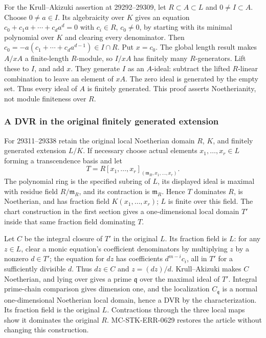 For the Krull--Akizuki assertion at 29292--29309, let \(R\subset A\subset L\) and \(0\ne I\subset A\). Choose \(0\ne a\in I\). Its algebraicity over \(K\) gives an equation \(c_0+c_1a+\cdots+c_da^d=0\) with \(c_i\in R\), \(c_0\ne0\), by starting with its minimal polynomial over \(K\) and clearing every denominator. Then \(c_0=-a(c_1+\cdots+c_da^{d-1})\in I\cap R\). Put \(x=c_0\). The global length result makes \(A/xA\) a finite-length \(R\)-module, so \(I/xA\) has finitely many \(R\)-generators. Lift these to \(I\), and add \(x\). They generate \(I\) as an \(A\)-ideal: subtract the lifted \(R\)-linear combination to leave an element of \(xA\). The zero ideal is generated by the empty set. Thus every ideal of \(A\) is finitely generated. This proof asserts Noetherianity, not module finiteness over \(R\).

\subsubsection{A DVR in the original finitely generated extension}\label{a-dvr-in-the-original-finitely-generated-extension}

For 29311--29338 retain the original local Noetherian domain \(R\), \(K\), and finitely generated extension \(L/K\). If necessary choose actual elements \(x_1,\ldots,x_r\in L\) forming a transcendence basis and let \[
 T=R[x_1,\ldots,x_r]_{(\mathfrak m_R,x_1,\ldots,x_r)}.
\] The polynomial ring is the specified subring of \(L\), its displayed ideal is maximal with residue field \(R/\mathfrak m_R\), and its contraction is \(\mathfrak m_R\). Hence \(T\) dominates \(R\), is Noetherian, and has fraction field \(K(x_1,\ldots,x_r)\); \(L\) is finite over this field. The chart construction in the first section gives a one-dimensional local domain \(T'\) inside that same fraction field dominating \(T\).

Let \(C\) be the integral closure of \(T'\) in the original \(L\). Its fraction field is \(L\): for any \(z\in L\), clear a monic equation's coefficient denominators by multiplying \(z\) by a nonzero \(d\in T'\); the equation for \(dz\) has coefficients \(d^{m-i}c_i\), all in \(T'\) for a sufficiently divisible \(d\). Thus \(dz\in C\) and \(z=(dz)/d\). Krull--Akizuki makes \(C\) Noetherian, and lying over gives a prime \(\mathfrak q\) over the maximal ideal of \(T'\). Integral prime-chain comparison gives dimension one, and the localization \(C_{\mathfrak q}\) is a normal one-dimensional Noetherian local domain, hence a DVR by the characterization. Its fraction field is the original \(L\). Contractions through the three local maps show it dominates the original \(R\). MC-STK-ERR-0629 restores the article without changing this construction.

